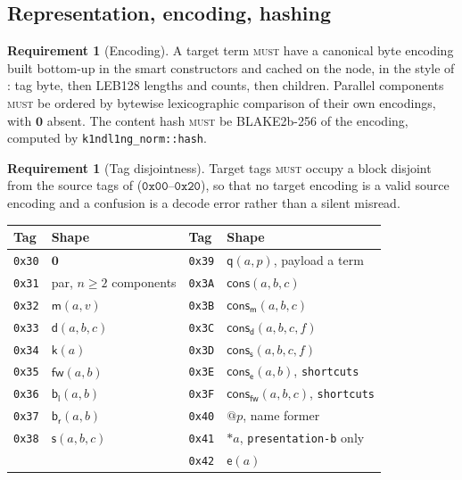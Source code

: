 \documentclass[11pt,a4paper]{article}
\makeatletter
\newcommand{\code}[1]{\texttt{#1}}
\newcommand{\MUST}{\textsc{must}}
\newcommand{\quo}[1]{@#1}
\newcommand{\drp}[1]{{*}#1}
\newcommand{\nil}{\mathbf{0}}
\newcommand{\mm}{\mathsf{m}}
\newcommand{\dd}{\mathsf{d}}
\newcommand{\kk}{\mathsf{k}}
\newcommand{\fw}{\mathsf{fw}}
\newcommand{\bl}{\mathsf{b}_{\mathsf{l}}}
\newcommand{\br}{\mathsf{b}_{\mathsf{r}}}
\newcommand{\sy}{\mathsf{s}}
\newcommand{\ev}{\mathsf{e}}
\newcommand{\qq}{\mathsf{q}}
\newcommand{\cons}{\mathsf{cons}}
\theoremstyle{definition}
\newtheorem{requirement}[definition]{Requirement}
\theoremstyle{plain}
\makeatother
\begin{document}
\subsection{Representation, encoding, hashing}

\begin{requirement}[Encoding]\label{req:enc}
A target term \MUST{} have a canonical byte encoding built bottom-up in the
smart constructors and cached on the node, in the style of
\cite[\S6]{k1ndl1ng}: tag byte, then LEB128 lengths and counts, then children.
Parallel components \MUST{} be ordered by bytewise lexicographic comparison of
their own encodings, with $\nil$ absent. The content hash \MUST{} be
BLAKE2b-256 of the encoding, computed by \code{k1ndl1ng\_norm::hash}.
\end{requirement}

\begin{requirement}[Tag disjointness]\label{req:tags}
Target tags \MUST{} occupy a block disjoint from the source tags of
\cite[\S6]{k1ndl1ng} ($\mathtt{0x00}$--$\mathtt{0x20}$), so that no target
encoding is a valid source encoding and a confusion is a decode error rather
than a silent misread.
\end{requirement}

\begin{center}
\begin{tabular}{@{}llll@{}}
\toprule
Tag & Shape & Tag & Shape\\
\midrule
\code{0x30} & $\nil$ & \code{0x39} & $\qq(a,p)$, payload a term\\
\code{0x31} & par, $n \geq 2$ components & \code{0x3A} & $\cons(a,b,c)$\\
\code{0x32} & $\mm(a,v)$ & \code{0x3B} & $\cons_{\mm}(a,b,c)$\\
\code{0x33} & $\dd(a,b,c)$ & \code{0x3C} & $\cons_{\dd}(a,b,c,f)$\\
\code{0x34} & $\kk(a)$ & \code{0x3D} & $\cons_{\sy}(a,b,c,f)$\\
\code{0x35} & $\fw(a,b)$ & \code{0x3E} & $\cons_{\ev}(a,b)$, \code{shortcuts}\\
\code{0x36} & $\bl(a,b)$ & \code{0x3F} & $\cons_{\fw}(a,b,c)$, \code{shortcuts}\\
\code{0x37} & $\br(a,b)$ & \code{0x40} & $\quo{p}$, name former\\
\code{0x38} & $\sy(a,b,c)$ & \code{0x41} & $\drp{a}$, \code{presentation-b}
  only\\
 & & \code{0x42} & $\ev(a)$\\
\bottomrule
\end{tabular}
\end{center}
\end{document}
